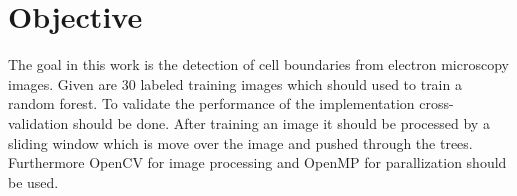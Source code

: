 \section{Objective}
\label{sec:objective}

The goal in this work is the detection of cell boundaries from electron microscopy images. Given are 30 labeled training images which should used to train a random forest.
To validate the performance of the implementation cross-validation should be done.
After training an image it should be processed by a sliding window which is move over the image and pushed through the trees.
Furthermore OpenCV for image processing and OpenMP for parallization should be used.